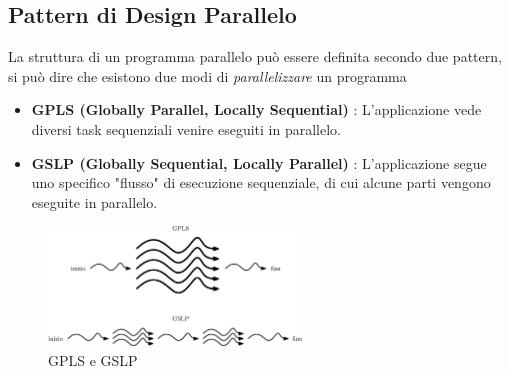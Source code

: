 \documentclass[10pt, letterpaper]{report}
\begin{document}
\subsection{Pattern di Design Parallelo}
La struttura di un programma parallelo può essere definita secondo due pattern, si può dire che esistono due modi 
di \textit{parallelizzare} un programma \begin{itemize}
    \item \textbf{GPLS (Globally Parallel, Locally Sequential)} : L'applicazione vede diversi task sequenziali venire eseguiti in parallelo. 
    \item \textbf{GSLP (Globally Sequential, Locally Parallel)} : L'applicazione segue uno specifico "flusso" di esecuzione sequenziale, di cui 
    alcune parti vengono eseguite in parallelo.
\end{itemize}
\begin{figure}[h!]
    \centering
    \includegraphics[width=0.6\textwidth]{images/GPLSoGSLP.eps}
    \caption{GPLS e GSLP}
    \label{fig:GPLSoGSLP}
\end{figure}
\end{document}
